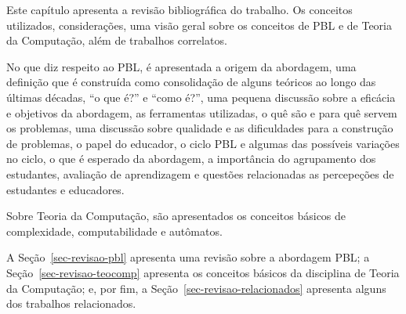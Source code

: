 \label{cap-revisao}
\acresetall

Este capítulo apresenta a revisão bibliográfica do trabalho.
Os conceitos utilizados, considerações, uma visão geral sobre os conceitos
de \ac{PBL} e de Teoria da Computação, além de trabalhos correlatos.

No que diz respeito ao \ac{PBL}, é apresentada a origem da abordagem,
uma definição que é construída como consolidação de alguns teóricos ao longo das últimas
décadas, ``o que é?'' e ``como é?'', uma pequena discussão sobre a eficácia e objetivos
da abordagem, as ferramentas utilizadas, o quê são e para quê servem os problemas, uma
discussão sobre qualidade e as dificuldades para a construção de problemas, o papel
do educador, o ciclo \ac{PBL} e algumas das possíveis variações no ciclo, o que é
esperado da abordagem, a importância do agrupamento dos estudantes,
avaliação de aprendizagem e questões relacionadas as percepeções de estudantes
e educadores.

Sobre Teoria da Computação, são apresentados os conceitos
básicos de complexidade, computabilidade e autômatos.

A Seção~\ref{sec-revisao-pbl} apresenta uma revisão sobre a abordagem \ac{PBL};
a Seção~\ref{sec-revisao-teocomp} apresenta os conceitos básicos da disciplina
de Teoria da Computação;
e, por fim, a Seção~\ref{sec-revisao-relacionados} apresenta alguns dos trabalhos
relacionados.




